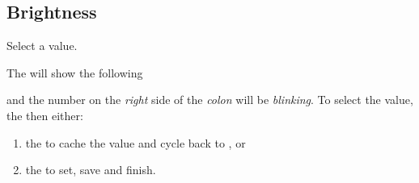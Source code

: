 
\subsection{Brightness} 

Select a  value.

\par\medskip

The  will show the following

\begin{figure}[H]
\centering
\end{figure}

and the number on the \textit{right} side of the \textit{colon} will be
\textit{blinking}.  To select the  value,  the  then
either:

\begin{enumerate}
  \item {} the  to cache the value and cycle back to , or
  \item {} the  to set, save and finish.
\end{enumerate}


